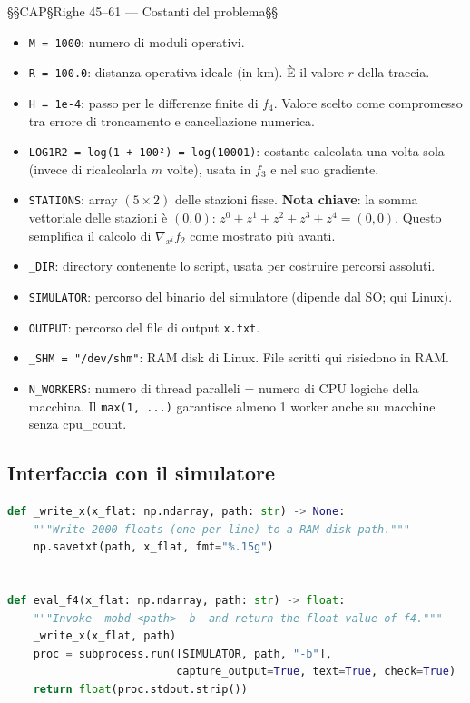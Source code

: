 \documentclass[12pt,a4paper]{article}
\theoremstyle{definition}
\newcommand{\grad}{\nabla}
\begin{document}
§§CAP§Righe 45–61 — Costanti del problema§§



\begin{itemize}[nosep]
  \item \texttt{M = 1000}: numero di moduli operativi.
  \item \texttt{R = 100.0}: distanza operativa ideale (in km). È il valore $r$ della traccia.
  \item \texttt{H = 1e-4}: passo per le differenze finite di $f_4$.
        Valore scelto come compromesso tra errore di troncamento e cancellazione numerica.
  \item \texttt{LOG1R2 = log(1 + 100²) = log(10001)}: costante calcolata una volta sola
        (invece di ricalcolarla $m$ volte), usata in $f_3$ e nel suo gradiente.
  \item \texttt{STATIONS}: array $(5 \times 2)$ delle stazioni fisse.
        \textbf{Nota chiave}: la somma vettoriale delle stazioni è $(0,0)$:
        $z^0 + z^1 + z^2 + z^3 + z^4 = (0,0)$.
        Questo semplifica il calcolo di $\grad_{x^i} f_2$ come mostrato più avanti.
  \item \texttt{\_DIR}: directory contenente lo script, usata per costruire percorsi assoluti.
  \item \texttt{SIMULATOR}: percorso del binario del simulatore (dipende dal SO; qui Linux).
  \item \texttt{OUTPUT}: percorso del file di output \texttt{x.txt}.
  \item \texttt{\_SHM = "/dev/shm"}: RAM disk di Linux. File scritti qui risiedono in RAM.
  \item \texttt{N\_WORKERS}: numero di thread paralleli = numero di CPU logiche della macchina.
        Il \texttt{max(1, ...)} garantisce almeno 1 worker anche su macchine senza cpu\_count.
\end{itemize}

\subsection{Interfaccia con il simulatore}

\begin{lstlisting}[language=Python]
def _write_x(x_flat: np.ndarray, path: str) -> None:
    """Write 2000 floats (one per line) to a RAM-disk path."""
    np.savetxt(path, x_flat, fmt="%.15g")


def eval_f4(x_flat: np.ndarray, path: str) -> float:
    """Invoke  mobd <path> -b  and return the float value of f4."""
    _write_x(x_flat, path)
    proc = subprocess.run([SIMULATOR, path, "-b"],
                          capture_output=True, text=True, check=True)
    return float(proc.stdout.strip())
\end{lstlisting}
\end{document}
